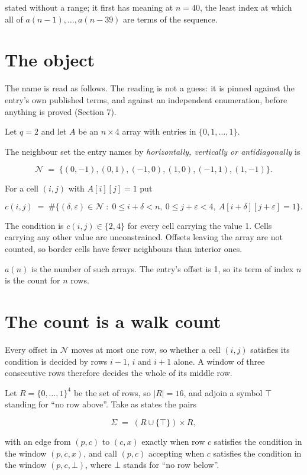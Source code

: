 \documentclass[11pt]{article}
\theoremstyle{definition}
\begin{document}
stated without a range; it first has meaning at $n = 40$, the least index at which all of $a(n-1),\dots,a(n-39)$ are terms of the sequence.

\section{The object}

The name is read as follows. The reading is not a guess: it is pinned against the entry's own published terms, and against an independent enumeration, before anything is proved (Section 7).

Let $q = 2$ and let $A$ be an $n \times 4$ array with entries in $\{0,1,\dots,1\}$.

The neighbour set the entry names by {\itshape horizontally, vertically or antidiagonally} is

\[\mathcal{N} \;=\; \{(0,-1), (0,1), (-1,0), (1,0), (-1,1), (1,-1)\}.\]

For a cell $(i,j)$ with $A[i][j] = 1$ put

\[c(i,j) \;=\; \#\bigl\{(\delta,\varepsilon)\in\mathcal{N} \;:\; 0\le i+\delta<n,\ 0\le j+\varepsilon<4,\ A[i+\delta][j+\varepsilon] = 1\bigr\}.\]

The condition is $c(i,j) \in \{2, 4\}$ for every cell carrying the value 1. Cells carrying any other value are unconstrained. Offsets leaving the array are not counted, so border cells have fewer neighbours than interior ones.

$a(n)$ is the number of such arrays. The entry's offset is 1, so its term of index $n$ is the count for $n$ rows.

\section{The count is a walk count}

Every offset in $\mathcal{N}$ moves at most one row, so whether a cell $(i,j)$ satisfies its condition is decided by rows $i-1$, $i$ and $i+1$ alone. A window of three consecutive rows therefore decides the whole of its middle row.

Let $R = \{0,\dots,1\}^{4}$ be the set of rows, so $|R| = 16$, and adjoin a symbol $\top$ standing for ``no row above''. Take as states the pairs

\[\Sigma \;=\; (R \cup \{\top\}) \times R,\]

with an edge from $(p,c)$ to $(c,x)$ exactly when row $c$ satisfies the condition in the window $(p,c,x)$, and call $(p,c)$ accepting when $c$ satisfies the condition in the window $(p,c,\bot)$, where $\bot$ stands for ``no row below''.
\end{document}
